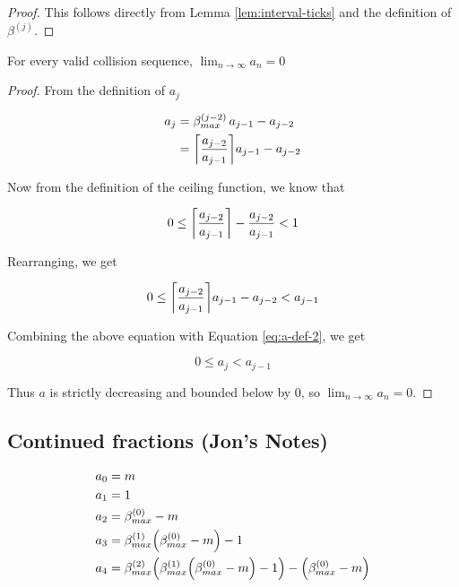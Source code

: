 \begin{proof}
	This follows directly from Lemma \ref{lem:interval-ticks} and the definition of $\beta^{(j)}$.
\end{proof}


\begin{theorem}
	For every valid collision sequence, ${\displaystyle \lim_{n \to \infty} a_n = 0}$
\end{theorem}

\begin{proof}
	From the definition of $a_j$

	\begin{align}\label{eq:a-def-2}
		a_j& = \beta^{(j-2)}_{max} \, a_{j-1} - a_{j-2}\\
		& =  \ceil{\frac{a_{j-2}}{a_{j-1}}} a_{j-1} - a_{j-2}
	\end{align}

	Now from the definition of the ceiling function, we know that

	\begin{equation}
		0 \le \ceil{\frac{a_{j-2}}{a_{j-1}}} - \frac{a_{j-2}}{a_{j-1}} < 1
	\end{equation}

	Rearranging, we get

	\begin{equation}
		0 \le \ceil{\frac{a_{j-2}}{a_{j-1}}} a_{j-1} - a_{j-2} < a_{j-1}
	\end{equation}

	Combining the above equation with Equation \ref{eq:a-def-2}, we get

	\begin{equation}
		0 \le a_j < a_{j-1}
	\end{equation}

	Thus $a$ is strictly decreasing and bounded below by 0, so ${\displaystyle \lim_{n \to \infty} a_n = 0}$.
\end{proof}

\subsection{Continued fractions (Jon's Notes)}

\begin{align}
	a_0& = m\\
	a_1& = 1\\
	a_2& = \beta^{(0)}_{max} - m\\
	a_3& = \beta^{(1)}_{max} \paren{\beta^{(0)}_{max} - m} - 1\\
	a_4& = \beta^{(2)}_{max} \paren{\beta^{(1)}_{max} \paren{\beta^{(0)}_{max} - m} - 1} - \paren{\beta^{(0)}_{max} - m}
\end{align}

